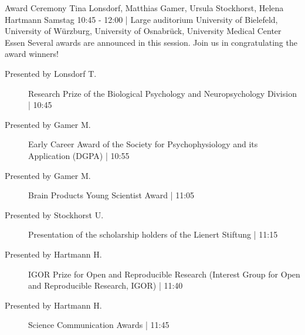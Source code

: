
            \begin{symposium}
            {Award Ceremony}
            {Tina Lonsdorf, Matthias Gamer, Ursula Stockhorst, Helena Hartmann}
            {Samstag 10:45 - 12:00 | Large auditorium}
            {University of Bielefeld, University of Würzburg, University of Osnabrück, University Medical Center Essen}
            Several awards are announced in this session. Join us in congratulating the award winners! 
            \begin{description}    
            
                \item [ Presented by Lonsdorf T.] Research Prize of the Biological Psychology and Neuropsychology Division \textcolor{mygray}{ | 10:45}    
                
                \item [ Presented by Gamer M.] Early Career Award of the Society for Psychophysiology and its Application (DGPA) \textcolor{mygray}{ | 10:55}    
                
                \item [ Presented by Gamer M.] Brain Products Young Scientist Award \textcolor{mygray}{ | 11:05}    
                
                \item [ Presented by Stockhorst U.] Presentation of the scholarship holders of the Lienert Stiftung \textcolor{mygray}{ | 11:15}    
                
                \item [ Presented by Hartmann H.] IGOR Prize for Open and Reproducible Research (Interest Group for Open and Reproducible Research, IGOR) \textcolor{mygray}{ | 11:40}    
                
                \item [ Presented by Hartmann H.] Science Communication Awards \textcolor{mygray}{ | 11:45}    
                
            \end{description} 
            \end{symposium}
            